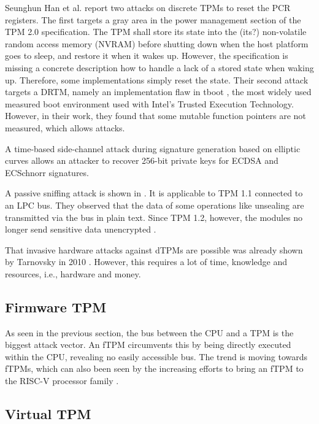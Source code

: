 Seunghun Han et al. \cite{aBadDream} report two attacks on discrete TPMs to reset the PCR registers. The first targets a gray area in the power management section of the TPM 2.0 specification. The TPM shall store its state into the (its?) non-volatile random access memory (NVRAM) before shutting down when the host platform goes to sleep, and restore it when it wakes up. However, the specification is missing a concrete description how to handle a lack of a stored state when waking up. Therefore, some implementations simply reset the state. Their second attack targets a DRTM, namely an implementation flaw in tboot \cite{tboot}, the most widely used measured boot environment used with Intel's Trusted Execution Technology. However, in their work, they found that some mutable function pointers are not measured, which allows attacks.

A time-based side-channel attack \cite{Moghimi2019} during signature generation based on elliptic curves allows an attacker to recover 256-bit private keys for ECDSA and ECSchnorr signatures.

A passive sniffing attack is shown in \cite{Kursawe2005AnalyzingTP}. It is applicable to TPM 1.1 connected to an LPC bus. They observed that the data of some operations like unsealing are transmitted via the bus in plain text. Since TPM 1.2, however, the modules no longer send sensitive data unencrypted \cite{Winter2013}.

That invasive hardware attacks against dTPMs are possible was already shown by Tarnovsky in 2010 \cite{tarnovsky}. However, this requires a lot of time, knowledge and resources, i.e., hardware and money.


\subsection{Firmware TPM}

As seen in the previous section, the bus between the CPU and a TPM is the biggest attack vector. An fTPM circumvents this by being directly executed within the CPU, revealing no easily accessible bus.
The trend is moving towards fTPMs, which can also been seen by the increasing efforts to bring an fTPM to the RISC-V processor family \cite{Boubakri2021}.

\subsection{Virtual TPM}


